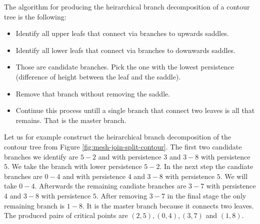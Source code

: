 The algorithm for producing the heirarchical branch decomposition of a contour tree is the following:

\begin{itemize}
    \item Identify all upper leafs that connect via branches to upwards saddles.
    \item Identify all lower leafs that connect via branches to downwards saddles.
    \item Those are candidate branches. Pick the one with the lowest persistence (difference of height between the leaf and the saddle).
    \item Remove that branch without removing the saddle.
    \item Continue this process untill a single branch that connect two leaves is all that remains. That is the master branch.
\end{itemize}

Let us for example construct the heirarchical branch decomposition of the contour tree from Figure \ref{fig:mesh-join-split-contour}. The first two candidate branches we identify are $5 - 2$ and with persistence $3$ and $3 - 8$ with persistence $5$. We take the branch with lower persistence $5 - 2$. In the next step the candiate branches are $0 - 4$ and with persistence $4$ and $3 - 8$ with persistence $5$. We will take $0 - 4$.
Afterwards the remaining candiate branches are $3 - 7$ with persistence $4$ and $3 - 8$ with persistence $5$. After removing $3 - 7$ in the final stage the only remaining branch is $1 - 8$. It is the master branch because it connects two leaves.
The produced pairs of critical points are $(2, 5), (0, 4), (3, 7)$ and $(1,8)$.

